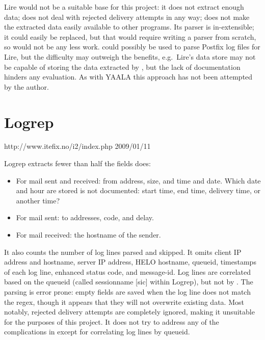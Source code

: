 Lire would not be a suitable base for this project: it does not extract
enough data; does not deal with rejected delivery attempts in any way; does
not make the extracted data easily available to other programs.  Its parser
is in-extensible; it could easily be replaced, but that would require
writing a parser from scratch, so would not be any less work.
\parsername{} could possibly be used to parse Postfix log files for Lire,
but the difficulty may outweigh the benefits, e.g.\ Lire's data store may
not be capable of storing the data extracted by \parsername{}, but the lack
of documentation hinders any evaluation.  As with YAALA this approach has
not been attempted by the author.

\section{Logrep}

{http://www.itefix.no/i2/index.php}
{2009/01/11}

Logrep extracts fewer than half the fields \parsername{} does:

\begin{itemize}

    \item For mail sent and received: from address, size, and time and
        date.  Which date and hour are stored is not documented: start
        time, end time, delivery time, or another time?

    \item For mail sent: to addresses,  code, and delay.

    \item For mail received: the hostname of the sender.

\end{itemize}

It also counts the number of log lines parsed and skipped.  It omits client
IP address and hostname, server IP address, HELO hostname, queueid,
timestamps of each log line, enhanced status code, and message-id\@.  Log
lines are correlated based on the queueid (called sessionname [sic] within
Logrep), but not by .  The parsing is error prone: empty
fields are saved when the log line does not match the regex, though it
appears that they will not overwrite existing data.  Most notably, rejected
delivery attempts are completely ignored, making it unsuitable for the
purposes of this project.  It does not try to address any of the
complications in  except for correlating log
lines by queueid.

